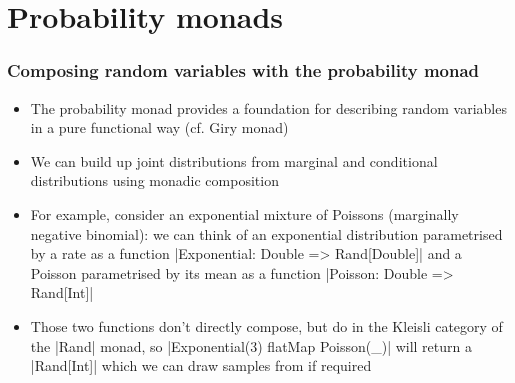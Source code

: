 \documentclass[mathserif,handout]{beamer}
\begin{document}

\section{Probability monads}

\begin{frame}[fragile]
  \frametitle{Composing random variables with the probability monad}
  \begin{itemize}
  \item The \alert{probability monad} provides a foundation for describing random variables in a pure functional way (cf. \alert{Giry monad})
  \item We can build up joint distributions from marginal and conditional distributions using \alert{monadic composition}
  \item For example, consider an exponential mixture of Poissons (marginally negative binomial): we can think of an exponential distribution parametrised by a rate as a function |Exponential: Double => Rand[Double]| and a Poisson parametrised by its mean as a function |Poisson: Double => Rand[Int]|
    \item Those two functions don't directly compose, but do in the Kleisli category of the |Rand| monad, so |Exponential(3) flatMap {Poisson(_)}| will return a |Rand[Int]| which we can draw samples from if required
  \end{itemize}
\end{frame}
\end{document}
